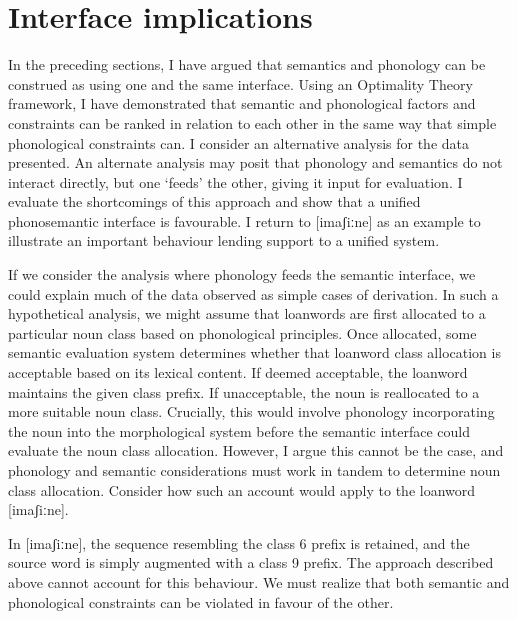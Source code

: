\documentclass[output=paper,colorlinks,citecolor=brown,
]{langscibook}
\begin{document}
\section{Interface implications} \label{sec:kinchsular:implications} 

In the preceding sections, I have argued that semantics and phonology can be construed as using one and the same interface. Using an Optimality Theory framework, I have demonstrated that semantic and phonological factors and constraints can be ranked in relation to each other in the same way that simple phonological constraints can. I consider an alternative analysis for the data presented. An alternate analysis may posit that phonology and semantics do not interact directly, but one ‘feeds’ the other, giving it input for evaluation. I evaluate the shortcomings of this approach and show that a unified phonosemantic interface is favourable. I return to  [imaʃiːne] as an example to illustrate an important behaviour lending support to a unified system.

If we consider the analysis where phonology feeds the semantic interface, we could explain much of the data observed as simple cases of derivation. In such a hypothetical analysis, we might assume that loanwords are first allocated to a particular noun class based on phonological principles. Once allocated, some semantic evaluation system determines whether that loanword class allocation is acceptable based on its lexical content. If deemed acceptable, the loanword maintains the given class prefix. If unacceptable, the noun is reallocated to a more suitable noun class. Crucially, this would involve phonology incorporating the noun into the morphological system before the semantic interface could evaluate the noun class allocation. However, I argue this cannot be the case, and phonology and semantic considerations must work in tandem to determine noun class allocation. Consider how such an account would apply to the loanword [imaʃiːne].

In [imaʃiːne], the sequence resembling the class 6 prefix is retained, and the source word is simply augmented with a class 9 prefix. The approach described above cannot account for this behaviour. We must realize that both semantic and phonological constraints can be violated in favour of the other.
\end{document}
